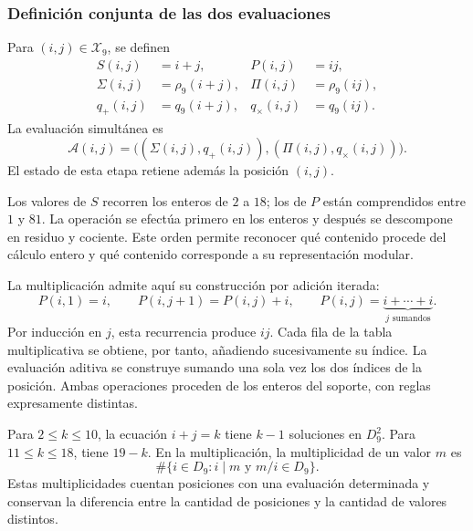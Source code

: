 \subsubsection{Definición conjunta de las dos evaluaciones}

\begin{definicion}
\label{def:app-evaluacion}
Para $(i,j)\in\mathcal X_9$, se definen
\begin{align}
 S(i,j)&=i+j, & P(i,j)&=ij,\\
 \Sigma(i,j)&=\rho_9(i+j), & \Pi(i,j)&=\rho_9(ij),\\
 q_+(i,j)&=q_9(i+j), &q_\times(i,j)&=q_9(ij).
\end{align}
La evaluación simultánea es
\begin{equation}
 \mathcal A(i,j)=\bigl((\Sigma(i,j),q_+(i,j)),
                         (\Pi(i,j),q_\times(i,j))\bigr).
 \label{eq:app-two-evaluations}
\end{equation}
El estado de esta etapa retiene además la posición $(i,j)$.
\end{definicion}

Los valores de $S$ recorren los enteros de $2$ a $18$; los de $P$ están comprendidos entre $1$ y $81$. La operación se efectúa primero en los enteros y después se descompone en residuo y cociente. Este orden permite reconocer qué contenido procede del cálculo entero y qué contenido corresponde a su representación modular.

La multiplicación admite aquí su construcción por adición iterada:
\[
 P(i,1)=i,\qquad P(i,j+1)=P(i,j)+i,
 \qquad P(i,j)=\underbrace{i+\cdots+i}_{j\text{ sumandos}}.
\]
Por inducción en $j$, esta recurrencia produce $ij$. Cada fila de la tabla multiplicativa se obtiene, por tanto, añadiendo sucesivamente su índice. La evaluación aditiva se construye sumando una sola vez los dos índices de la posición. Ambas operaciones proceden de los enteros del soporte, con reglas expresamente distintas.

Para $2\leq k\leq10$, la ecuación $i+j=k$ tiene $k-1$ soluciones en $D_9^2$. Para $11\leq k\leq18$, tiene $19-k$. En la multiplicación, la multiplicidad de un valor $m$ es
\[
 \#\{i\in D_9:i\mid m\text{ y }m/i\in D_9\}.
\]
Estas multiplicidades cuentan posiciones con una evaluación determinada y conservan la diferencia entre la cantidad de posiciones y la cantidad de valores distintos.



